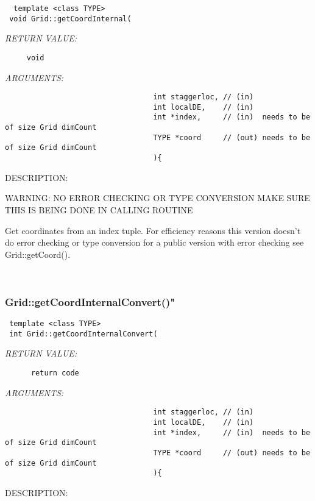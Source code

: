   
\begin{verbatim}  template <class TYPE>
 void Grid::getCoordInternal(\end{verbatim}{\em RETURN VALUE:}
\begin{verbatim}     void\end{verbatim}{\em ARGUMENTS:}
\begin{verbatim}                                  int staggerloc, // (in)
                                  int localDE,    // (in)
                                  int *index,     // (in)  needs to be of size Grid dimCount
                                  TYPE *coord     // (out) needs to be of size Grid dimCount
                                  ){\end{verbatim}
{\sf DESCRIPTION:\\ }


  
     WARNING: NO ERROR CHECKING OR TYPE CONVERSION MAKE SURE THIS IS BEING DONE IN CALLING ROUTINE
   
    Get coordinates from an index tuple. For efficiency reasons this version doesn't do error checking or
    type conversion for a public version with error checking see  Grid::getCoord().  
  
   
 
\mbox{}\hrulefill\
 
\subsubsection [Grid::getCoordInternalConvert()"] {Grid::getCoordInternalConvert()"}


  
\begin{verbatim} template <class TYPE>
 int Grid::getCoordInternalConvert(\end{verbatim}{\em RETURN VALUE:}
\begin{verbatim}      return code\end{verbatim}{\em ARGUMENTS:}
\begin{verbatim}                                  int staggerloc, // (in)
                                  int localDE,    // (in)
                                  int *index,     // (in)  needs to be of size Grid dimCount
                                  TYPE *coord     // (out) needs to be of size Grid dimCount
                                  ){\end{verbatim}
{\sf DESCRIPTION:\\ }


